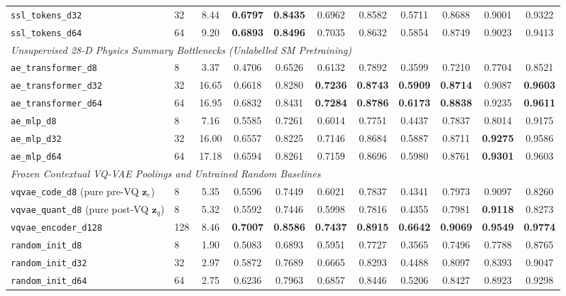 \documentclass{article}
\begin{document}
\begin{table}[htbp]
{\begin{tabular}{llccccccccc}
\texttt{ssl\_tokens\_d32} & 32 & 8.44 & \textbf{0.6797} & \textbf{0.8435} & 0.6962 & 0.8582 & 0.5711 & 0.8688 & 0.9001 & 0.9322 \\
\texttt{ssl\_tokens\_d64} & 64 & 9.20 & \textbf{0.6893} & \textbf{0.8496} & 0.7035 & 0.8632 & 0.5854 & 0.8749 & 0.9023 & 0.9413 \\
\midrule
\multicolumn{11}{l}{\textit{Unsupervised 28-D Physics Summary Bottlenecks (Unlabelled SM Pretraining)}} \\
\texttt{ae\_transformer\_d8} & 8 & 3.37 & 0.4706 & 0.6526 & 0.6132 & 0.7892 & 0.3599 & 0.7210 & 0.7704 & 0.8521 \\
\texttt{ae\_transformer\_d32} & 32 & 16.65 & 0.6618 & 0.8280 & \textbf{0.7236} & \textbf{0.8743} & \textbf{0.5909} & \textbf{0.8714} & 0.9087 & \textbf{0.9603} \\
\texttt{ae\_transformer\_d64} & 64 & 16.95 & 0.6832 & 0.8431 & \textbf{0.7284} & \textbf{0.8786} & \textbf{0.6173} & \textbf{0.8838} & 0.9235 & \textbf{0.9611} \\
\texttt{ae\_mlp\_d8} & 8 & 7.16 & 0.5585 & 0.7261 & 0.6014 & 0.7751 & 0.4437 & 0.7837 & 0.8014 & 0.9175 \\
\texttt{ae\_mlp\_d32} & 32 & 16.00 & 0.6557 & 0.8225 & 0.7146 & 0.8684 & 0.5887 & 0.8711 & \textbf{0.9275} & 0.9586 \\
\texttt{ae\_mlp\_d64} & 64 & 17.18 & 0.6594 & 0.8261 & 0.7159 & 0.8696 & 0.5980 & 0.8761 & \textbf{0.9301} & 0.9603 \\
\midrule
\multicolumn{11}{l}{\textit{Frozen Contextual VQ-VAE Poolings and Untrained Random Baselines}} \\
\texttt{vqvae\_code\_d8} (pure pre-VQ $\mathbf{z}_e$) & 8 & 5.35 & 0.5596 & 0.7449 & 0.6021 & 0.7837 & 0.4341 & 0.7973 & 0.9097 & 0.8260 \\
\texttt{vqvae\_quant\_d8} (pure post-VQ $\mathbf{z}_q$) & 8 & 5.32 & 0.5592 & 0.7446 & 0.5998 & 0.7816 & 0.4355 & 0.7981 & \textbf{0.9118} & 0.8273 \\
\texttt{vqvae\_encoder\_d128} & 128 & 8.46 & \textbf{0.7007} & \textbf{0.8586} & \textbf{0.7437} & \textbf{0.8915} & \textbf{0.6642} & \textbf{0.9069} & \textbf{0.9549} & \textbf{0.9774} \\
\texttt{random\_init\_d8} & 8 & 1.90 & 0.5083 & 0.6893 & 0.5951 & 0.7727 & 0.3565 & 0.7496 & 0.7788 & 0.8765 \\
\texttt{random\_init\_d32} & 32 & 2.97 & 0.5872 & 0.7689 & 0.6665 & 0.8293 & 0.4488 & 0.8097 & 0.8393 & 0.9047 \\
\texttt{random\_init\_d64} & 64 & 2.75 & 0.6236 & 0.7963 & 0.6857 & 0.8446 & 0.5206 & 0.8427 & 0.8923 & 0.9298 \\

\end{tabular}}
\end{table}
\end{document}

